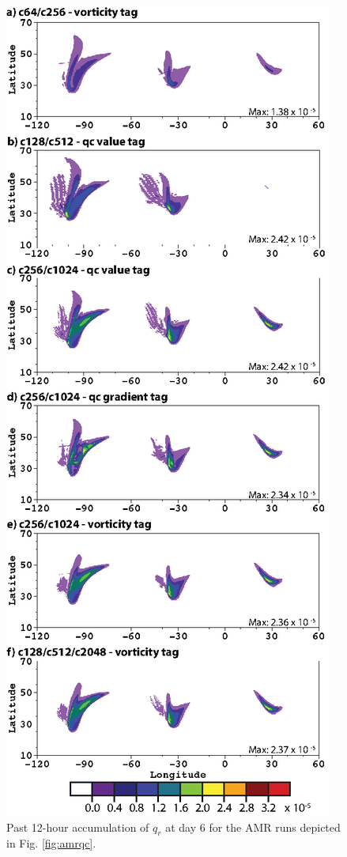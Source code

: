  \begin{figure}
   \centerline{%
   \noindent
   \includegraphics[height=.75\textheight]{Chap2/A_amr_qrdt_zoom-01}}
   \caption{Past 12-hour accumulation of $q_r$ at day 6 for the AMR runs depicted in Fig. \ref{fig:amrqc}.
   }
   \label{fig:amrqrdt}
\end{figure}

